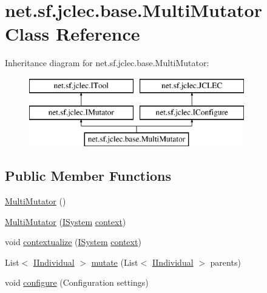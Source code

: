 \hypertarget{classnet_1_1sf_1_1jclec_1_1base_1_1_multi_mutator}{\section{net.\-sf.\-jclec.\-base.\-Multi\-Mutator Class Reference}
\label{classnet_1_1sf_1_1jclec_1_1base_1_1_multi_mutator}
}
Inheritance diagram for net.\-sf.\-jclec.\-base.\-Multi\-Mutator\-:\begin{figure}[H]
\begin{center}
\leavevmode
\includegraphics[height=3.000000cm]{classnet_1_1sf_1_1jclec_1_1base_1_1_multi_mutator}
\end{center}
\end{figure}
\subsection*{Public Member Functions}
\begin{DoxyCompactItemize}
\item 
\hyperlink{classnet_1_1sf_1_1jclec_1_1base_1_1_multi_mutator_ad18e27f125836680a28cdb72adc5b1d7}{Multi\-Mutator} ()
\item 
\hyperlink{classnet_1_1sf_1_1jclec_1_1base_1_1_multi_mutator_aa9ea7009000fa4a1b7fd58f00cdd6916}{Multi\-Mutator} (\hyperlink{interfacenet_1_1sf_1_1jclec_1_1_i_system}{I\-System} \hyperlink{classnet_1_1sf_1_1jclec_1_1base_1_1_multi_mutator_a57d0ceede263269327910e02566c6197}{context})
\item 
void \hyperlink{classnet_1_1sf_1_1jclec_1_1base_1_1_multi_mutator_a1c5204b6dcf9f3323a8dcf8271df56e0}{contextualize} (\hyperlink{interfacenet_1_1sf_1_1jclec_1_1_i_system}{I\-System} \hyperlink{classnet_1_1sf_1_1jclec_1_1base_1_1_multi_mutator_a57d0ceede263269327910e02566c6197}{context})
\item 
List$<$ \hyperlink{interfacenet_1_1sf_1_1jclec_1_1_i_individual}{I\-Individual} $>$ \hyperlink{classnet_1_1sf_1_1jclec_1_1base_1_1_multi_mutator_a5105b8a2a0d197df01dba6c0887bdc0e}{mutate} (List$<$ \hyperlink{interfacenet_1_1sf_1_1jclec_1_1_i_individual}{I\-Individual} $>$ parents)
\item 
void \hyperlink{classnet_1_1sf_1_1jclec_1_1base_1_1_multi_mutator_aa53f85d2c875c525b9fb1670b6128109}{configure} (Configuration settings)
\end{DoxyCompactItemize}
